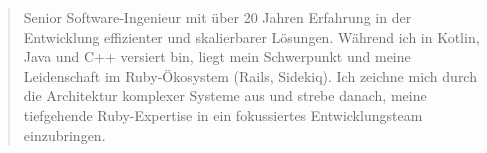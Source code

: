 \begin{minipage}{\linewidth}
\begin{quote}
Senior Software-Ingenieur mit über 20 Jahren Erfahrung in der Entwicklung effizienter und skalierbarer Lösungen. Während ich in Kotlin, Java und C++ versiert bin, liegt mein Schwerpunkt und meine Leidenschaft im Ruby-Ökosystem (Rails, Sidekiq). Ich zeichne mich durch die Architektur komplexer Systeme aus und strebe danach, meine tiefgehende Ruby-Expertise in ein fokussiertes Entwicklungsteam einzubringen.
\end{quote}
\end{minipage}
